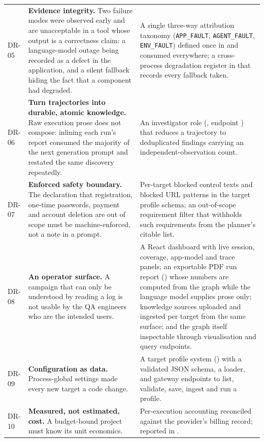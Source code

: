 \begin{xltabular}{\textwidth}{@{}>{\hsize}Y>{\hsize}Y>{\hsize}Y@{}}
  \addlinespace
  DR-05 & \textbf{Evidence integrity.} Two failure modes were observed early and are unacceptable in a tool whose output is a correctness claim: a language-model outage being recorded as a defect in the application, and a silent fallback hiding the fact that a component had degraded. &
  A single three-way attribution taxonomy (\texttt{APP\_FAULT}, \texttt{AGENT\_FAULT}, \texttt{ENV\_FAULT}) defined once in  and consumed everywhere; a cross-process degradation register in  that records every fallback taken. \\
  \addlinespace
  DR-06 & \textbf{Turn trajectories into durable, atomic knowledge.} Raw execution prose does not compose: inlining each run's report consumed the majority of the next generation prompt and restated the same discovery repeatedly. &
  An investigator role (, endpoint ) that reduces a trajectory to deduplicated findings carrying an independent-observation count. \\
  \addlinespace
  DR-07 & \textbf{Enforced safety boundary.} The declaration that registration, one-time passwords, payment and account deletion are out of scope must be machine-enforced, not a note in a prompt. &
  Per-target blocked control texts and blocked URL patterns in the target profile schema; an out-of-scope requirement filter that withholds such requirements from the planner's citable list. \\
  \addlinespace
  DR-08 & \textbf{An operator surface.} A campaign that can only be understood by reading a log is not usable by the QA engineers who are the intended users. &
  A React dashboard with live session, coverage, app-model and trace panels; an exportable PDF run report () whose numbers are computed from the graph while the language model supplies prose only; knowledge sources uploaded and ingested per target from the same surface; and the graph itself inspectable through visualisation and query endpoints. \\
  \addlinespace
  DR-09 & \textbf{Configuration as data.} Process-global settings made every new target a code change. &
  A target profile system () with a validated JSON schema, a loader, and gateway endpoints to list, validate, save, ingest and run a profile. \\
  \addlinespace
  DR-10 & \textbf{Measured, not estimated, cost.} A budget-bound project must know its unit economics. &
  Per-execution accounting reconciled against the provider's billing record; reported in . \\

\end{xltabular}
